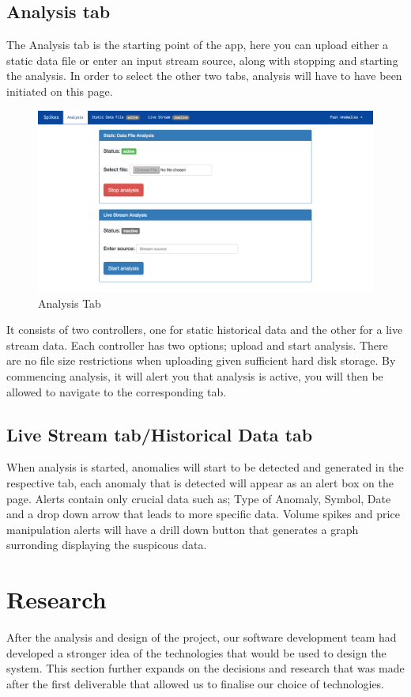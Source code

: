 \documentclass[12pt]{article}
\begin{document}
  \subsection{Analysis tab}
  The Analysis tab is the starting point of the app, here you can upload either a static data file or enter an input stream source, along with stopping and starting the analysis.
  In order to select the other two tabs, analysis will have to have been initiated on this page.
  \begin{figure}[H]
  \centering
  \includegraphics[width=120mm]{analysisTab.png}
  \caption{Analysis Tab}
  \end{figure}
  It consists of two controllers, one for static historical data and the other for a live stream data.
  Each controller has two options; upload and start analysis. There are no file size restrictions when uploading given sufficient hard disk storage.
  By commencing analysis, it will alert you that analysis is active, you will then be allowed to navigate to the corresponding tab.
  \subsection{Live Stream tab/Historical Data tab}
  When analysis is started, anomalies will start to be detected and generated in the respective tab, each anomaly that is detected will appear as an alert box on the page.
  Alerts contain only crucial data such as; Type of Anomaly, Symbol, Date and a drop down arrow that leads to more specific data.
  Volume spikes and price manipulation alerts will have a drill down button that generates a graph surronding displaying the suspicous data.
\section{Research}
  After the analysis and design of the project, our software development team had developed a stronger idea
  of the technologies that would be used to design the system. This section further expands on the decisions and
  research that was made after the first deliverable that allowed us to finalise our choice of technologies.
\end{document}
